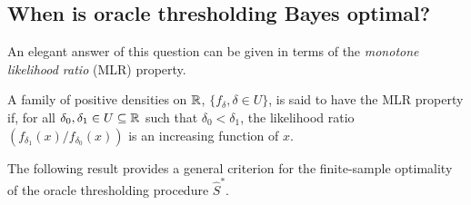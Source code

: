 \subsection{When is oracle thresholding Bayes optimal?} %
\label{subsec:optimal-procedure-sub-exponential}

An elegant answer of this question can be given in terms of the \emph{monotone likelihood ratio} (MLR) property.

\begin{definition}
A family of positive densities on $\mathbb R$, $\{f_\delta, \delta \in U\}$, is said to have the MLR property if, for all $\delta_0, \delta_1\in U\subseteq\mathbb R$ such that $\delta_0 < \delta_1$, the likelihood ratio $\left(f_{\delta_1}(x)/f_{\delta_0}(x)\right)$ is an increasing function of $x$.
\end{definition}

The following result provides a general criterion for the finite-sample optimality of the oracle thresholding 
procedure $\widehat{S}^*$.

